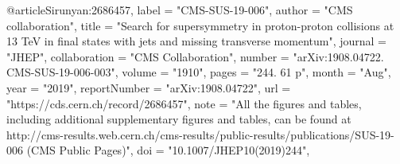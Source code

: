 @article{Sirunyan:2686457,
      label          = "CMS-SUS-19-006",
      author        = "{CMS collaboration}",
      title         = "{Search for supersymmetry in proton-proton collisions at
                       13 TeV in final states with jets and missing transverse
                       momentum}",
      journal       = "JHEP",
      collaboration = "CMS Collaboration",
      number        = "arXiv:1908.04722. CMS-SUS-19-006-003",
      volume        = "1910",
      pages         = "244. 61 p",
      month         = "Aug",
      year          = "2019",
      reportNumber  = "arXiv:1908.04722",
      url           = "https://cds.cern.ch/record/2686457",
      note          = "All the figures and tables, including additional
                       supplementary   figures and tables, can be found at  
                       http://cms-results.web.cern.ch/cms-results/public-results/publications/SUS-19-006
                         (CMS Public Pages)",
      doi           = "10.1007/JHEP10(2019)244",
}

